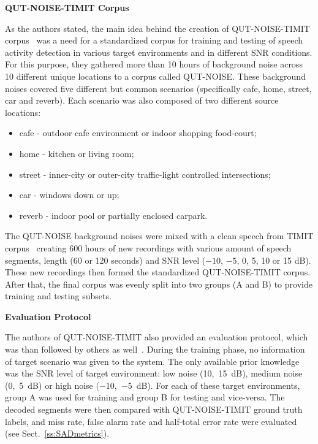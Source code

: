 \documentclass[FM,noheader,EN,bwtitles]{tulthesis}
\begin{document}
\bigskip
\noindent
\textbf{QUT-NOISE-TIMIT Corpus}
\medskip

\noindent
As the authors stated, the main idea behind the creation of QUT-NOISE-TIMIT corpus~\parencite{DBLP:conf/interspeech/DeanSVM10} was a need for a standardized corpus for training and testing of speech activity detection in various target environments and in different SNR conditions.
For this purpose, they gathered more than 10 hours of background noise across 10 different unique locations to a corpus called QUT-NOISE.
These background noises covered five different but common scenarios (specifically cafe, home, street, car and reverb).
Each scenario was also composed of two different source locations:
\begin{itemize}
	\item cafe - outdoor cafe environment or indoor shopping food-court; 
	\item home - kitchen or living room;
	\item street - inner-city or outer-city traffic-light controlled intersections;
	\item car - windows down or up;
	\item reverb - indoor pool or partially enclosed carpark.
\end{itemize}	
The QUT-NOISE background noises were mixed with a clean speech from TIMIT corpus~\parencite{timit:1986} creating 600 hours of new recordings with various amount of speech segments, length (60 or 120 seconds) and SNR level ($-10$, $-5$, 0, 5, 10 or 15 dB).
These new recordings then formed the standardized QUT-NOISE-TIMIT corpus.
After that, the final corpus was evenly split into two groups (A and B) to provide training and testing subsets.

\bigskip
\noindent
\textbf{Evaluation Protocol}
\medskip

\noindent
The authors of QUT-NOISE-TIMIT also provided an evaluation protocol, which was than followed by others as well~\parencite{DBLP:conf/icassp/WisdomOAP15, DBLP:conf/interspeech/GhaemmaghamiDKS15}.
During the training phase, no information of target scenario was given to the system.
The only available prior knowledge was the SNR level of target environment: low noise (10,~15~dB), medium noise (0,~5~dB) or high noise ($-10$,~$-5$~dB).
For each of these target environments, group A was used for training and group B for testing and vice-versa.
The decoded segments were then compared with QUT-NOISE-TIMIT ground truth labels, and miss rate, false alarm rate and half-total error rate were evaluated (see Sect.~\ref{ss:SADmetrics}).
\end{document}
